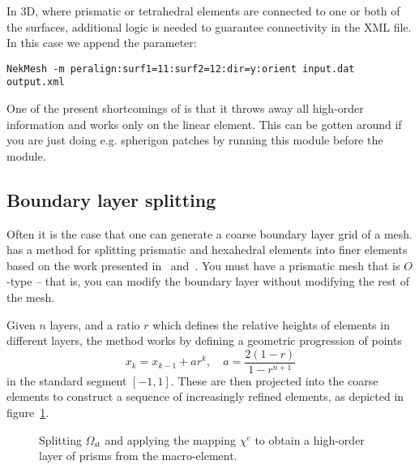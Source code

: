 In 3D, where prismatic or tetrahedral elements are connected to one or both of
the surfaces, additional logic is needed to guarantee connectivity in the XML
file. In this case we append the  parameter:
%
\begin{lstlisting}[style=BashInputStyle]
NekMesh -m peralign:surf1=11:surf2=12:dir=y:orient input.dat output.xml
\end{lstlisting}

\begin{notebox}
  One of the present shortcomings of  is that it throws away all
  high-order information and works only on the linear element. This can be
  gotten around if you are just doing e.g. spherigon patches by running this
   module before the  module.
\end{notebox}

\subsection{Boundary layer splitting}

Often it is the case that one can generate a coarse boundary layer grid of a
mesh. \nm has a method for splitting prismatic and hexahedral elements into
finer elements based on the work presented in~\cite{MoHaPeSh14}
and~\cite{MoHaPeSh14b}. You must have a prismatic mesh that is $O$-type -- that
is, you can modify the boundary layer without modifying the rest of the mesh.

Given $n$ layers, and a ratio $r$ which defines the relative heights of elements
in different layers, the method works by defining a geometric progression of
points
\[
x_k = x_{k-1} + ar^k, \quad a = \frac{2(1-r)}{1 - r^{n+1}}
\]
in the standard segment $[-1,1]$. These are then projected into the coarse
elements to construct a sequence of increasingly refined elements, as depicted
in figure~\ref{fig:util:mc:split}.

\begin{figure}
  \begin{center}
  \end{center}
  \caption{Splitting $\Omega_{\text{st}}$ and applying the mapping $\chi^e$ to
    obtain a high-order layer of prisms from the macro-element.}
  \label{fig:util:mc:split}
\end{figure}

